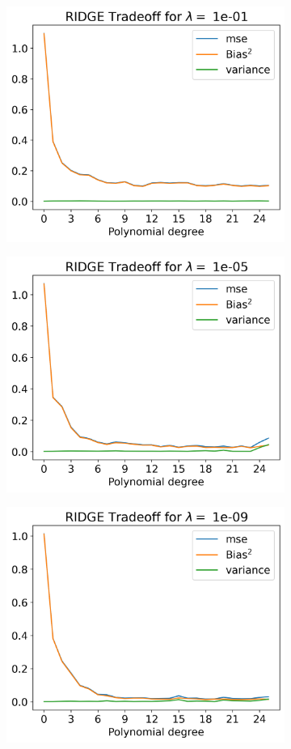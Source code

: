 \documentclass[12pt]{article}
\begin{document}
\begin{figure}[H]
  \begin{subfigure}{.5\textwidth}
    \centering
    \includegraphics[width=.8\textwidth]{../figures/tradeoff_RIDGE_1e-01real.png}
    \caption{}
    \label{fig:}
  \end{subfigure}
  \begin{subfigure}{.5\textwidth}
    \centering
    \includegraphics[width=.8\textwidth]{../figures/tradeoff_RIDGE_1e-05real.png}
    \caption{}
    \label{fig:}
  \end{subfigure}
  \begin{subfigure}{.5\textwidth}
    \centering
    \includegraphics[width=.8\textwidth]{../figures/tradeoff_RIDGE_1e-09real.png}

\end{subfigure}
\end{figure}
\end{document}
